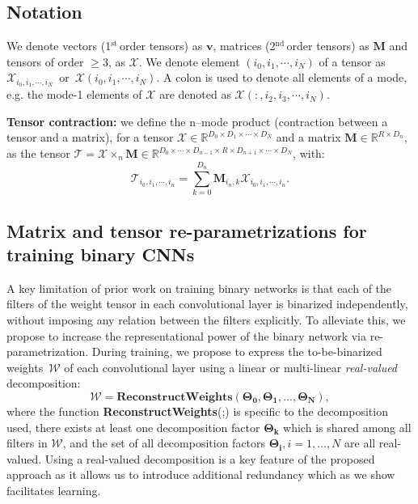 \documentclass[10pt,twocolumn,letterpaper]{article}
\newcommand{\mytensor}[1]{\ensuremath{\mathcal{#1}}}
\newcommand{\myvector}[1]{\ensuremath{\mathbf{#1}}}
\newcommand{\mymatrix}[1]{\ensuremath{\mathbf{#1}}}
\newcommand{\myst}{\ensuremath{^{\text{st}}}\,}
\newcommand{\mynd}{\ensuremath{^{\text{nd}}}\,}
\begin{document}
\subsection{Notation}\label{ssec:notation}
We denote vectors (1\myst order tensors) as \(\myvector{v}\), matrices (2\mynd order tensors) as \(\mymatrix{M}\) and tensors of order $\geq 3$, as \(\mytensor{X}\). We denote element \((i_0, i_1, \cdots, i_N)\) of a tensor as \(\mytensor{X}_{i_0, i_1, \cdots, i_N} \,\text{ or } \, \mytensor{X}(i_0, i_1, \cdots, i_N)\). A colon is used to denote all elements of a mode, e.g. the mode-1 elements of \(\mytensor{X}\) are denoted as \(\mytensor{X}(:, i_2, i_3, \cdots, i_N)\).

\noindent \textbf{Tensor contraction:} we define the n--mode product (contraction between a tensor and a matrix), for a tensor \(\mytensor{X} \in \mathbb{R}^{D_0 \times D_1 \times \cdots \times D_N}\) and a matrix \( \mymatrix{M} \in \mathbb{R}^{R \times D_n} \), as the tensor \(\mytensor{T} = \mytensor{X} \times_n \mymatrix{M} \in \mathbb{R}^{D_0 \times \cdots \times D_{n-1} \times R \times D_{n+1} \times \cdots \times D_N} \), with:
\begin{equation}
    \mytensor{T}_{i_0, i_1, \cdots, i_n} = \sum_{k=0}^{D_n} \mymatrix{M}_{i_n, k} \mytensor{X}_{i_0, i_1, \cdots, i_n}.
\end{equation}














\subsection{Matrix and tensor re-parametrizations for training binary CNNs}\label{ssec:binary-tensorized-convolutional}





A key limitation of prior work on training binary networks is that each of the filters of the weight tensor in each convolutional layer is binarized independently, without imposing any relation between the filters explicitly. To alleviate this, we propose to increase the representational power of the binary network via re-parametrization. During training, we propose to express the to-be-binarized weights~$\mytensor{W}$ of each convolutional layer using a linear or multi-linear \textit{real-valued} decomposition:  
\begin{equation}
    \mytensor{W} = \textbf{ReconstructWeights}(\mymatrix{\Theta_0}, \mymatrix{\Theta_{1}}, ... , \mymatrix{\Theta_{N}}),
\end{equation}
where the function \textbf{ReconstructWeights}(;) is specific to the decomposition used, there exists at least one decomposition factor $\mymatrix{\Theta_k}$ which is shared among all filters in $\mytensor{W}$, and the set of all decomposition factors $\mymatrix{\Theta_i}, i=1, \dots, N$ are all real-valued. Using a real-valued decomposition is a key feature of the proposed approach as it allows us to introduce additional redundancy which as we show facilitates learning. 
\end{document}
